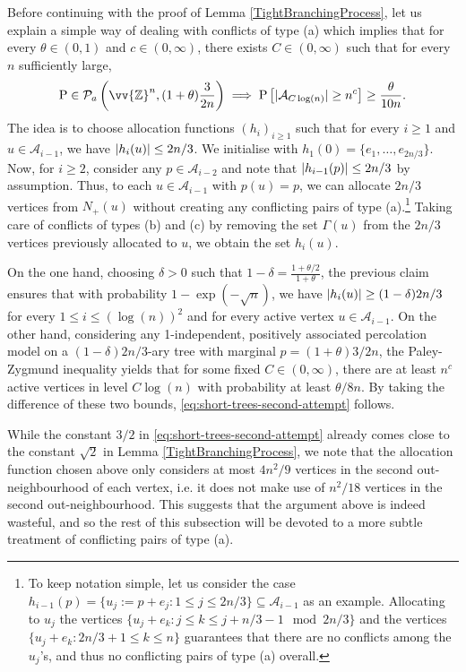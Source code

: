 \documentclass[11pt]{article}
\renewcommand{\P}{\mathrm{P}}
\newcommand{\Z}{\mathbb{Z}}
\newcommand{\A}{\mathcal{A}}
\DeclarePairedDelimiter{\abs}{\lvert}{\rvert}
\theoremstyle{remark}
\begin{document}
Before continuing with the proof of Lemma \ref{TightBranchingProcess}, let us explain a simple way of dealing with conflicts of type (a) which implies that for every $\theta \in (0,1)$ and $c \in (0,\infty)$, there exists $C \in (0,\infty)$ such that for every $n$ sufficiently large,
    \begin{equation} \label{eq:short-trees-second-attempt}
        \P \in \mathcal{P}_a\left(\vv{\Z}^n,(1 + \theta)\frac{3}{2n} \right) \implies \P\left[\abs{\A_{C\log(n)}} \ge n^c \right] \ge \frac{\theta}{10n}.
    \end{equation}
The idea is to choose allocation functions $(h_i)_{i\ge 1}$ such that for every $i\ge 1$ and $u \in \A_{i-1}$, we have $\abs{h_i(u)}\le 2n/3$. We initialise with $h_1(0) = \{e_1,\ldots,e_{2n/3}\}$. Now, for $i\ge 2$, consider any $p \in \A_{i-2}$ and note that $\abs{h_{i-1}(p)}\le 2n/3$ by assumption. Thus, to each $u \in \A_{i-1}$ with $p(u)=p$, we can allocate $2n/3$ vertices from $N_+(u)$ without creating any conflicting pairs of type (a).\footnote{To keep notation simple, let us consider the case $h_{i-1}(p) = \{u_j :=p+e_j : 1 \le j \le 2n/3\} \subseteq \A_{i-1}$ as an example. Allocating to $u_j$ the vertices $\{u_j + e_k : j \le k \le j+  n/3 -1 \mod 2n/3\}$ and the vertices  $\{u_j + e_k : 2n/3 + 1 \le k \le n\}$ guarantees that there are no conflicts among the $u_j$'s, and thus no conflicting pairs of type (a) overall.} Taking care of conflicts of types (b) and (c) by removing the set $\Gamma(u)$ from the $2n/3$ vertices previously allocated to $u$, we obtain the set $h_i(u)$. 

On the one hand, choosing $\delta>0$ such that $1-\delta = \frac{1+\theta/2}{1+\theta}$, the previous claim ensures that with probability $1-\exp(-\sqrt{n})$, we have $\abs{h_i(u)}\ge (1-\delta) 2n/3$ for every $1 \le i \le (\log(n))^2$ and for every active vertex $u \in \A_{i-1}$. On the other hand, considering any 1-independent, positively associated percolation model on a $(1-\delta)2n/3$-ary tree with marginal $p=(1+\theta)3/2n$, the Paley-Zygmund inequality yields that for some fixed $C \in (0,\infty)$, there are at least $n^c$ active vertices in level $C\log(n)$ with probability at least $\theta/8n$. By taking the difference of these two bounds, \eqref{eq:short-trees-second-attempt} follows. 


While the constant $3/2$ in \eqref{eq:short-trees-second-attempt} already comes close to the constant $\sqrt{2}$ in Lemma \ref{TightBranchingProcess}, we note that the allocation function chosen above only considers at most $4n^2/9$ vertices in the second out-neighbourhood of each vertex, i.e. it does not make use of $n^2/18$ vertices in the second out-neighbourhood. This suggests that the argument above is indeed wasteful, and so the rest of this subsection will be devoted to a more subtle treatment of conflicting pairs of type (a).
\end{document}
